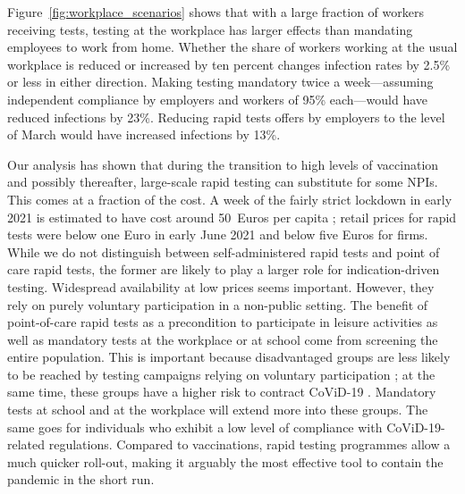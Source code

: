 Figure~\ref{fig:workplace_scenarios} shows that with a large fraction of workers
receiving tests, testing at the workplace has larger effects than mandating employees to
work from home. Whether the share of workers working at the usual workplace is reduced
or increased by ten percent changes infection rates by 2.5\% or less in either
direction. Making testing mandatory twice a week---assuming independent compliance by
employers and workers of 95\% each---would have reduced infections by 23\%. Reducing
rapid tests offers by employers to the level of March would have increased infections by
13\%.

Our analysis has shown that during the transition to high levels of vaccination and
possibly thereafter, large-scale rapid testing can substitute for some NPIs. This comes
at a fraction of the cost. A week of the fairly strict lockdown in early 2021 is
estimated to have cost around 50~Euros per capita \citep{Wollmershauser2021}; retail
prices for rapid tests were below one Euro in early June 2021 and below five Euros for
firms. While we do not distinguish between self-administered rapid tests and point of
care rapid tests, the former are likely to play a larger role for indication-driven
testing. Widespread availability at low prices seems important. However, they rely on
purely voluntary participation in a non-public setting. The benefit of point-of-care
rapid tests as a precondition to participate in leisure activities as well as mandatory
tests at the workplace or at school come from screening the entire population. This is
important because disadvantaged groups are less likely to be reached by testing campaigns
relying on voluntary participation \citep[e.g.][]{StillmanTonin2021}; at the same time,
these groups have a higher risk to contract CoViD-19 \citep{KochInstitut2021a}. Mandatory
tests at school and at the workplace will extend more into these groups. The same goes
for individuals who exhibit a low level of compliance with CoViD-19-related regulations.
Compared to vaccinations, rapid testing programmes allow a much quicker roll-out, making
it arguably the most effective tool to contain the pandemic in the short run.
